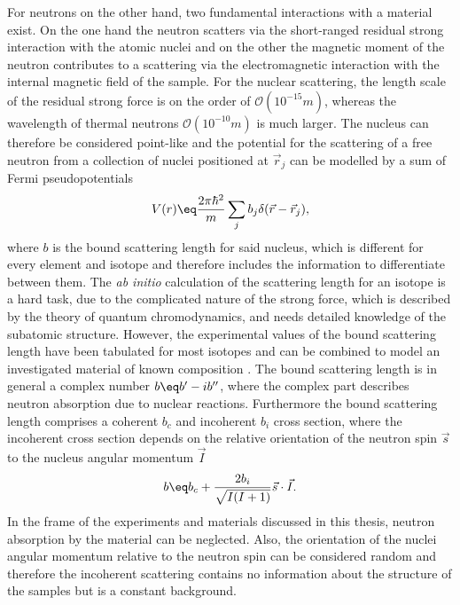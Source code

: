 \documentclass[\main/dresen_thesis.tex]{subfiles}
\begin{document}
For neutrons on the other hand, two fundamental interactions with a material exist.
On the one hand the neutron scatters via the short-ranged residual strong interaction with the atomic nuclei and on the other the magnetic moment of the neutron contributes to a scattering via the electromagnetic interaction with the internal magnetic field of the sample.
For the nuclear scattering, the length scale of the residual strong force is on the order of $\mathcal{O} (10^{-15} \unit{m})$, whereas the wavelength of thermal neutrons $\mathcal{O} (10^{-10} \unit{m})$ is much larger.
The nucleus can therefore be considered point-like and the potential for the scattering of a free neutron from a collection of nuclei positioned at $\vec{r}_j$ can be modelled by a sum of Fermi pseudopotentials
\begin{align}
  V(r) \eq \frac{2 \pi \hbar^2}{m} \sum_j b_j \delta(\vec{r} - \vec{r}_j),\label{eq:theoreticalBackground:scattering:scatteringTheory:neutronScatteringPotentialSum}
 \end{align}
where $b$ is the bound scattering length for said nucleus, which is different for every element and isotope and therefore includes the  information to differentiate between them.
The \textit{ab initio} calculation of the scattering length for an isotope is a hard task, due to the complicated nature of the strong force, which is described by the theory of quantum chromodynamics, and needs detailed knowledge of the subatomic structure.
However, the experimental values of the bound scattering length have been tabulated for most isotopes and can be combined to model an investigated material of known composition \cite{Sears_1992_Neutr}.
The bound scattering length is in general a complex number $b \eq b^\prime - i b^{\prime \prime}$, where the complex part describes neutron absorption due to nuclear reactions.
Furthermore the bound scattering length comprises a coherent $b_c$ and incoherent $b_i$ cross section, where the incoherent cross section depends on the relative orientation of the neutron spin $\vec{s}$ to the nucleus angular momentum $\vec{I}$
\begin{align}
  b \eq b_c + \frac{2 b_i}{\sqrt{I(I+1)}} \vec{s} \cdot \vec{I}.
\end{align}
In the frame of the experiments and materials discussed in this thesis, neutron absorption by the material can be neglected.
Also, the orientation of the nuclei angular momentum relative to the neutron spin can be considered random and therefore the incoherent scattering contains no information about the structure of the samples but is a constant background.
\end{document}
